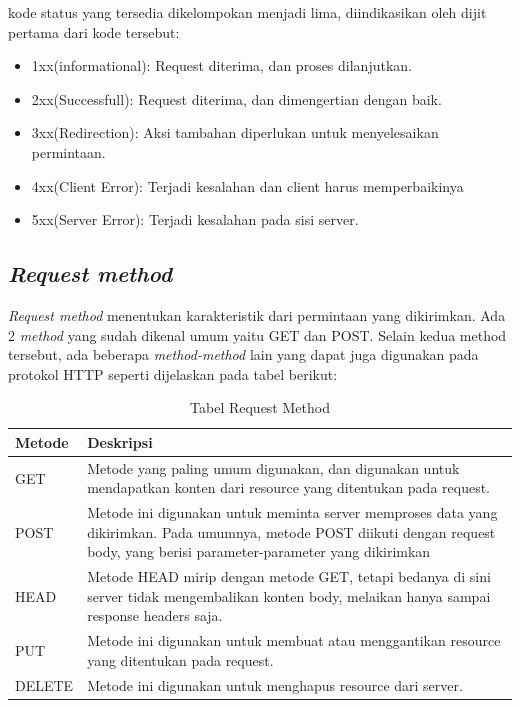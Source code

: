 kode status yang tersedia dikelompokan menjadi lima, diindikasikan oleh dijit pertama dari kode tersebut:
\begin{itemize}
	\item 1xx(informational): Request diterima, dan proses dilanjutkan.
	\item 2xx(Successfull): Request diterima, dan dimengertian dengan baik.
	\item 3xx(Redirection): Aksi tambahan diperlukan untuk menyelesaikan permintaan.
	\item 4xx(Client Error): Terjadi kesalahan dan client harus memperbaikinya
	\item 5xx(Server Error):  Terjadi kesalahan pada sisi server.
\end{itemize}

\subsection{\textit{Request method}}
\label{subsec:requestmethod}

\textit{Request method} menentukan karakteristik dari permintaan yang dikirimkan. Ada 2 \textit{method} yang sudah dikenal umum yaitu GET dan POST. Selain kedua method tersebut, ada beberapa \textit{method-method} lain yang dapat juga digunakan pada protokol HTTP seperti dijelaskan pada tabel berikut: 

\begin{table}[H]
\centering
\begin{tabular}{|p{3cm}|p{6cm}|}
\hline
\textbf{Metode} & \textbf{Deskripsi}                                                                                                                                                                        \\\hline
GET    & Metode yang paling umum digunakan, dan digunakan untuk mendapatkan konten dari resource yang ditentukan pada request.                                                            \\\hline
POST   & Metode ini digunakan untuk meminta server memproses data yang dikirimkan. Pada umumnya, metode POST diikuti dengan request body, yang berisi parameter-parameter yang dikirimkan \\\hline
HEAD   & Metode HEAD mirip dengan metode GET, tetapi bedanya di sini server tidak mengembalikan konten body, melaikan hanya sampai response headers saja.                                 \\\hline
PUT    & Metode ini digunakan untuk membuat atau menggantikan resource yang ditentukan pada request.                                                                                      \\\hline
DELETE & Metode ini digunakan untuk menghapus resource dari server.             \\\hline                                                                                                       
\end{tabular}
\caption[Tabel Request Method]{Tabel Request Method}
\label{table:requestmethod}
\end{table}



